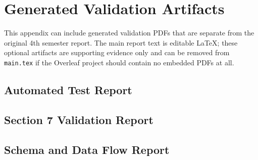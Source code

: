\section{Generated Validation Artifacts}

This appendix can include generated validation PDFs that are separate from the original 4th semester report. The main report text is editable LaTeX; these optional artifacts are supporting evidence only and can be removed from \texttt{main.tex} if the Overleaf project should contain no embedded PDFs at all.

\subsection{Automated Test Report}


\clearpage
\subsection{Section 7 Validation Report}


\clearpage
\subsection{Schema and Data Flow Report}

